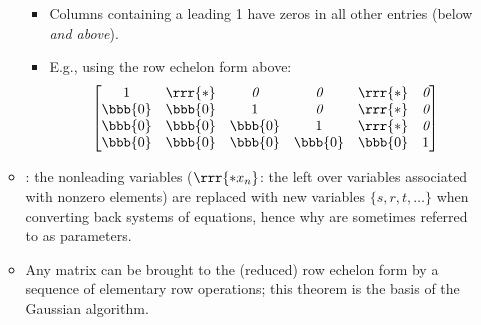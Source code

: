 \begin{itemize}
\begin{itemize}
\begin{itemize}
      \item Columns containing a leading 1 have zeros in all other entries (below \emph{and above}).
      \item E.g., using the row echelon form above:
      \[%
      \begin{bmatrix}
        1 & \rrr{*} & \emph{0} & \emph{0} & \rrr{*} & \emph{0} \\
        \bbb{0} & \bbb{0} & 1 & \emph{0} & \rrr{*} & \emph{0} \\
        \bbb{0} & \bbb{0} & \bbb{0} & 1 & \rrr{*} & \emph{0} \\
        \bbb{0} & \bbb{0} & \bbb{0} & \bbb{0} & \bbb{0} & 1 \\
      \end{bmatrix}
      \]%
    \end{itemize}
    \item {}: the nonleading variables (\(\rrr{*x_n}\): the left over variables associated with nonzero elements) are replaced with new variables \(\{s,r,t,\dots\}\) when converting back systems of equations, hence why \hyperref[Linear Equations]{} are sometimes referred to as parameters. %
    \item Any matrix can be brought to the (reduced) row echelon form by a sequence of elementary row operations; this theorem is the basis of the Gaussian algorithm. 
  \end{itemize}
  

\end{itemize}

